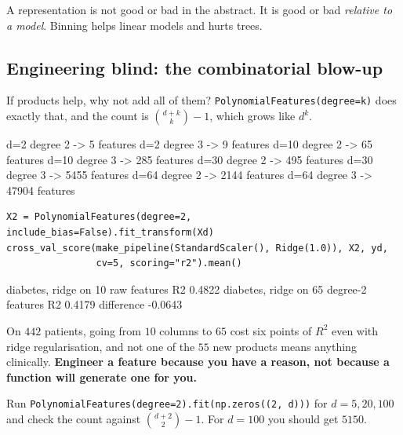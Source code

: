 \documentclass[11pt]{article}
\begin{document}
\begin{keyidea}
A representation is not good or bad in the abstract. It is good or bad
\emph{relative to a model}. Binning helps linear models and hurts trees.
\end{keyidea}

\subsection{Engineering blind: the combinatorial blow-up}
\label{sec:poly}

If products help, why not add all of them? \texttt{PolynomialFeatures(degree=k)}
does exactly that, and the count is $\binom{d+k}{k}-1$, which grows like $d^k$.

\begin{codeout}
  d=2   degree 2 ->     5 features  d=2   degree 3 ->     9 features
  d=10  degree 2 ->    65 features  d=10  degree 3 ->   285 features
  d=30  degree 2 ->   495 features  d=30  degree 3 ->  5455 features
  d=64  degree 2 ->  2144 features  d=64  degree 3 -> 47904 features
\end{codeout}

\begin{lstlisting}
X2 = PolynomialFeatures(degree=2, include_bias=False).fit_transform(Xd)
cross_val_score(make_pipeline(StandardScaler(), Ridge(1.0)), X2, yd,
                cv=5, scoring="r2").mean()
\end{lstlisting}
\begin{codeout}
diabetes, ridge on 10 raw features        R2 0.4822
diabetes, ridge on 65 degree-2 features   R2 0.4179
difference                                   -0.0643
\end{codeout}

\begin{caution}
On $442$ patients, going from $10$ columns to $65$ cost six points of $R^2$
even with ridge regularisation, and not one of the $55$ new products means
anything clinically. \textbf{Engineer a feature because you have a reason, not
because a function will generate one for you.}
\end{caution}

\begin{tryit}
Run \texttt{PolynomialFeatures(degree=2).fit(np.zeros((2,\,d)))} for
$d = 5, 20, 100$ and check the count against $\binom{d+2}{2}-1$. For $d=100$
you should get $5150$.
\end{tryit}

\notesources{\AMLUnitIVSources}
\end{document}
